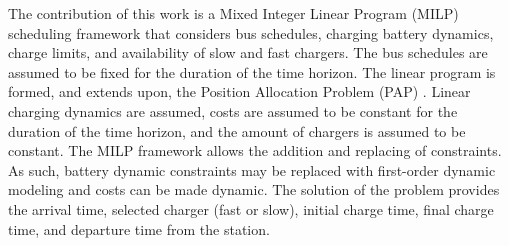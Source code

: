 \documentclass[letterpaper, 10pt, conference]{IEEEtran}
\begin{document}
The contribution of this work is a Mixed Integer Linear Program (MILP) scheduling framework that considers bus schedules, charging battery dynamics, charge limits, and availability of slow and fast chargers. The bus schedules are assumed to be fixed for the duration of the time horizon. The linear program is formed, and extends upon, the Position Allocation Problem (PAP) \cite{Qarebagh2019}. Linear charging dynamics are assumed, costs are assumed to be constant for the duration of the time horizon, and the amount of chargers is assumed to be constant. The MILP framework allows the addition and replacing of constraints. As such, battery dynamic constraints may be replaced with first-order dynamic modeling and costs can be made dynamic. The solution of the problem provides the arrival time, selected charger (fast or slow), initial charge time, final charge time, and departure time from the station. 
\end{document}
